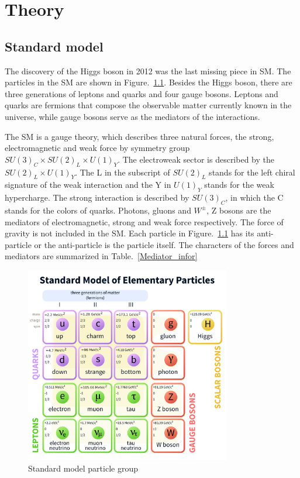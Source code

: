 
\chapter{Theory}

\section{Standard model}
The discovery of the Higgs boson in 2012 was the last missing piece in SM.  The particles in the SM are shown in Figure.~\ref{fig:SM_particles}. Besides the Higgs boson, there are three generations of leptons and quarks and four gauge bosons. 
Leptons and quarks are fermions that compose the observable matter currently known in the universe, while gauge bosons serve as the mediators of the interactions.  

The SM is a gauge theory, which describes three natural forces, the strong, electromagnetic and weak force by symmetry group $SU(3)_{C}\times SU(2)_{L}\times U(1)_{Y}$. The electroweak sector is described by the  $SU(2)_{L}\times U(1)_{Y}$. The L in the subscript of $SU(2)_{L}$ stands for the left chiral signature of the weak interaction and the Y in $U(1)_{Y}$ stands for the weak hypercharge. The strong interaction is described by $SU(3)_{C}$, in which the C stands for the colors of quarks.  Photons, gluons and $W^{\pm}$, Z bosons are the mediators of electromagnetic, strong and weak force respectively. The force of gravity is not included in the SM. Each particle in Figure.~\ref{fig:SM_particles} has its anti-particle or the anti-particle is the particle itself. The characters of the forces and mediators are summarized in Table.~\ref{Mediator_infor}

\begin{figure}[htbp] 
\centering
\includegraphics[width=0.8\textwidth]{chapter2/SM_particle_table.pdf}
\caption{Standard model particle group\cite{SM_particletable}}
\label{fig:SM_particles}
\end{figure}


